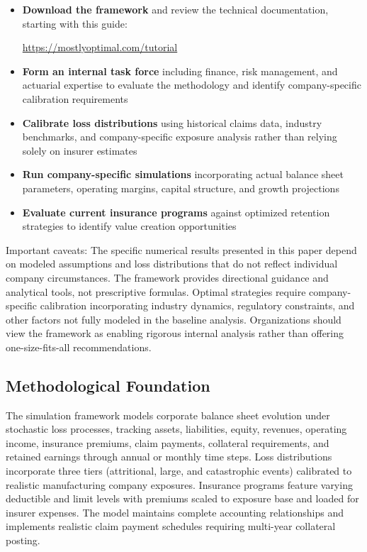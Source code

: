 \documentclass[11pt,letterpaper]{article}
\begin{document}
\begin{itemize}
    \item \textbf{Download the framework} and review the technical documentation, starting with this guide:

        \url{https://mostlyoptimal.com/tutorial}

    \item \textbf{Form an internal task force} including finance, risk management, and actuarial expertise to evaluate the methodology and identify company-specific calibration requirements
    \item \textbf{Calibrate loss distributions} using historical claims data, industry benchmarks, and company-specific exposure analysis rather than relying solely on insurer estimates
    \item \textbf{Run company-specific simulations} incorporating actual balance sheet parameters, operating margins, capital structure, and growth projections
    \item \textbf{Evaluate current insurance programs} against optimized retention strategies to identify value creation opportunities
\end{itemize}

Important caveats: The specific numerical results presented in this paper depend on modeled assumptions and loss distributions that do not reflect individual company circumstances. The framework provides directional guidance and analytical tools, not prescriptive formulas. Optimal strategies require company-specific calibration incorporating industry dynamics, regulatory constraints, and other factors not fully modeled in the baseline analysis. Organizations should view the framework as enabling rigorous internal analysis rather than offering one-size-fits-all recommendations.

\subsection{Methodological Foundation}

The simulation framework models corporate balance sheet evolution under stochastic loss processes, tracking assets, liabilities, equity, revenues, operating income, insurance premiums, claim payments, collateral requirements, and retained earnings through annual or monthly time steps. Loss distributions incorporate three tiers (attritional, large, and catastrophic events) calibrated to realistic manufacturing company exposures. Insurance programs feature varying deductible and limit levels with premiums scaled to exposure base and loaded for insurer expenses. The model maintains complete accounting relationships and implements realistic claim payment schedules requiring multi-year collateral posting.
\end{document}
